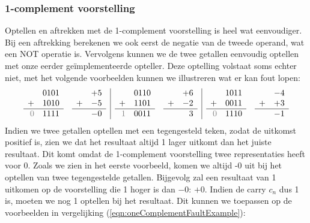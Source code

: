 \subsubsection{1-complement voorstelling}
Optellen en aftrekken met de 1-complement voorstelling is heel wat eenvoudiger. Bij een aftrekking berekenen we ook eerst de negatie van de tweede operand, wat een NOT operatie is. Vervolgens kunnen we de twee getallen eenvoudig optellen met onze eerder ge\"implementeerde opteller. Deze optelling volstaat soms echter niet, met het volgende voorbeelden kunnen we illustreren wat er kan fout lopen:
\begin{equation}
\begin{array}{rl|rl|rl}
\begin{array}{rr}
&0101\\
+&1010\\\hline
\textcolor{gray}{0}&1111
\end{array}
&
\begin{array}{rr}
&+5\\
+&-5\\\hline
&-0
\end{array}
&
\begin{array}{rr}
&0110\\
+&1101\\\hline
\textcolor{gray}{1}&0011
\end{array}
&
\begin{array}{rr}
&+6\\
+&-2\\\hline
&3
\end{array}
&
\begin{array}{rr}
&1011\\
+&0011\\\hline
\textcolor{gray}{0}&1110
\end{array}
&
\begin{array}{rr}
&-4\\
+&+3\\\hline
&-1
\end{array}
\end{array}
\label{eqn:oneComplementFaultExample}
\end{equation}
Indien we twee getallen optellen met een tegengesteld teken, zodat de uitkomst positief is, zien we dat het resultaat altijd 1 lager uitkomt dan het juiste resultaat. Dit komt omdat de 1-complement voorstelling twee representaties heeft voor 0. Zoals we zien in het eerste voorbeeld, komen we altijd -0 uit bij het optellen van twee tegengestelde getallen. Bijgevolg zal een resultaat van 1 uitkomen op de voorstelling die 1 hoger is dan $-0$: $+0$. Indien de carry $c_n$ dus 1 is, moeten we nog 1 optellen bij het resultaat. Dit kunnen we toepassen op de voorbeelden in vergelijking (\ref{eqn:oneComplementFaultExample}):
